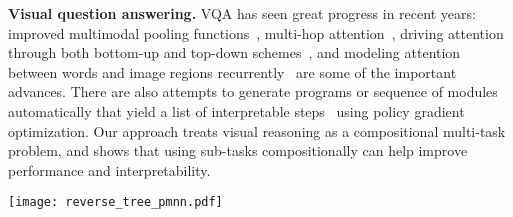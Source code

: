 \documentclass{article}
\makeatletter
\newcommand{\SK}[1]{{\color{NavyBlue}{[@Seung: #1]}}}
\def\PMN{PMN}
\makeatother
\begin{document}
\textbf{Visual question answering.}
VQA has seen great progress in recent years: improved multimodal pooling functions~\citep{fukui16mcb, kim2018bilinear}, multi-hop attention~\citep{yang16san}, driving attention through both bottom-up and top-down schemes~\citep{anderson17}, and modeling attention between words and image regions recurrently~\citep{hudson2018compositional} are some of the important advances.
There are also attempts to generate programs or sequence of modules automatically that yield a list of interpretable steps~\citep{hu17,johnson17clevrprogram} using policy gradient optimization.
Our approach treats visual reasoning as a compositional multi-task problem, and shows that using sub-tasks compositionally can help improve performance and interpretability.

\vspace{-10mm}
\begin{minipage}{0.56\linewidth}
\begin{center}
\texttt{[image: reverse\_tree\_pmnn.pdf]}
\end{center}
\end{minipage}
\begin{minipage}{0.44\linewidth}
\caption{\footnotesize An example computation graph for \PMN~with four tasks.
Green rectangles denote terminal modules, and yellow rectangles denote compositional modules.
Blue arrows and red arrows represent calling and receiving outputs from submodules, respectively.
White numbered circles denote computation order.
For convenience, assume task levels correspond to the subscripts.
Calling $M_3$ invokes a chain of calls (blue arrows) to lower level modules which stop at the terminal modules.
}
\label{fig:overview}
\end{minipage}
\vspace{-10mm}
\end{document}
